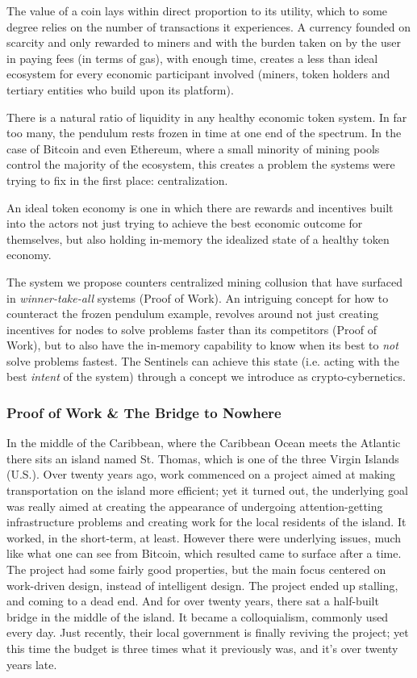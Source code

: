 \documentclass{article}
\begin{document}
The value of a coin lays within direct proportion to its utility, which to some degree relies on the number of transactions it experiences. A currency founded on scarcity and only rewarded to miners and with the burden taken on by the user in paying fees (in terms of gas), with enough time, creates a less than ideal ecosystem for every economic participant involved (miners, token holders and tertiary entities who build upon its platform).

There is a natural ratio of liquidity in any healthy economic token system. In far too many, the pendulum rests frozen in time at one end of the spectrum. In the case of Bitcoin and even Ethereum, where a small minority of mining pools control the majority of the ecosystem, this creates a problem the systems were trying to fix in the first place: centralization.

An ideal token economy is one in which there are rewards and incentives built into the actors not just trying to achieve the best economic outcome for themselves, but also holding in-memory the idealized state of a healthy token economy.

The system we propose counters centralized mining collusion that have surfaced in \textit{winner-take-all} systems (Proof of Work). An intriguing concept for how to counteract the frozen pendulum example, revolves around not just creating incentives for nodes to solve problems faster than its competitors (Proof of Work), but to also have the in-memory capability to know when its best to \textit{not} solve problems fastest. The Sentinels can achieve this state (i.e. acting with the best \textit{intent} of the system) through a concept we introduce as crypto-cybernetics.

\subsubsection{Proof of Work \& The Bridge to Nowhere}

In the middle of the Caribbean, where the Caribbean Ocean meets the Atlantic there sits an island named St. Thomas, which is one of the three Virgin Islands (U.S.). Over twenty years ago, work commenced on a project aimed at making transportation on the island more efficient; yet it turned out, the underlying goal was really aimed at creating the appearance of undergoing attention-getting infrastructure problems and creating work for the local residents of the island. It worked, in the short-term, at least. However there were underlying issues, much like what one can see from Bitcoin, which resulted came to surface after a time. The project had some fairly good properties, but the main focus centered on work-driven design, instead of intelligent design. The project ended up stalling, and coming to a dead end. And for over twenty years, there sat a half-built bridge in the middle of the island. It became a colloquialism, commonly used every day. Just recently, their local government is finally reviving the project; yet this time the budget is three times what it previously was, and it's over twenty years late.
\end{document}
